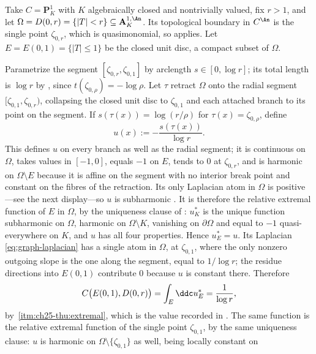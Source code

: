 \begin{example}
\label{ex:ch25-thuillier-disc}
Take $C=\mathbf P^1_K$ with $K$ algebraically closed and nontrivially
valued, fix $r>1$, and let
$\Omega=D(0,r)=\{|T|<r\}\subseteq\mathbf A^{1,\An}_K$.  Its topological
boundary in $C^{\An}$ is the single point $\zeta_{0,r}$, which is
quasimonomial, so  applies.  Let
$E=E(0,1)=\{|T|\leq1\}$ be the closed unit disc, a compact subset of
$\Omega$.

Parametrize the segment $[\zeta_{0,r},\zeta_{0,1}]$ by arclength
$s\in[0,\log r]$; its total length is $\log r$ by
, since $t(\zeta_{0,\rho})=-\log\rho$.  Let $\tau$ retract $\Omega$ onto the radial segment
$[\zeta_{0,1},\zeta_{0,r})$, collapsing the closed unit disc to
$\zeta_{0,1}$ and each attached branch to its point on the segment.
If $s(\tau(x))=\log(r/\rho)$ for
$\tau(x)=\zeta_{0,\rho}$, define
\[
 u(x):=-\frac{s(\tau(x))}{\log r}.
\]
This defines $u$ on every branch as well as the radial segment; it
is continuous on $\Omega$, takes values in $[-1,0]$, equals $-1$ on
$E$, tends to $0$ at $\zeta_{0,r}$, and is harmonic on
$\Omega\setminus E$ because it is affine on the segment with no interior
break point and constant on the fibres of the retraction.  Its only
Laplacian atom in $\Omega$ is positive---see the next display---so $u$ is
subharmonic \cite[Th\'eor\`eme~3.4.12]{Thu05}.  It is therefore the relative
extremal function of $E$ in $\Omega$, by the uniqueness clause of
\cite[Th\'eor\`eme~3.6.13]{Thu05}: $u^*_K$ is the unique function
subharmonic on $\Omega$, harmonic on $\Omega\setminus K$, vanishing on
$\partial\Omega$ and equal to $-1$ quasi-everywhere on $K$, and $u$
has all four properties.  Hence $u^*_E=u$.  Its Laplacian
\eqref{eq:graph-laplacian} has a single atom in $\Omega$, at
$\zeta_{0,1}$, where the only nonzero outgoing slope is the one along the
segment, equal to $1/\log r$; the residue directions into $E(0,1)$
contribute $0$ because $u$ is constant there.  Therefore
\begin{equation}
\label{eq:ch25-thuillier-disc}
 C\bigl(E(0,1),D(0,r)\bigr)=\int_E\ddc u^*_E=\frac1{\log r},
\end{equation}
by \,\cref{itm:ch25-thu:extremal}, which is
the value recorded in \cite[Remarque~3.6.12]{Thu05}.  The same function is
the relative extremal function of the single point $\zeta_{0,1}$, by the
same uniqueness clause: $u$ is harmonic on
$\Omega\setminus\{\zeta_{0,1}\}$ as well, being locally constant on

\end{example}
